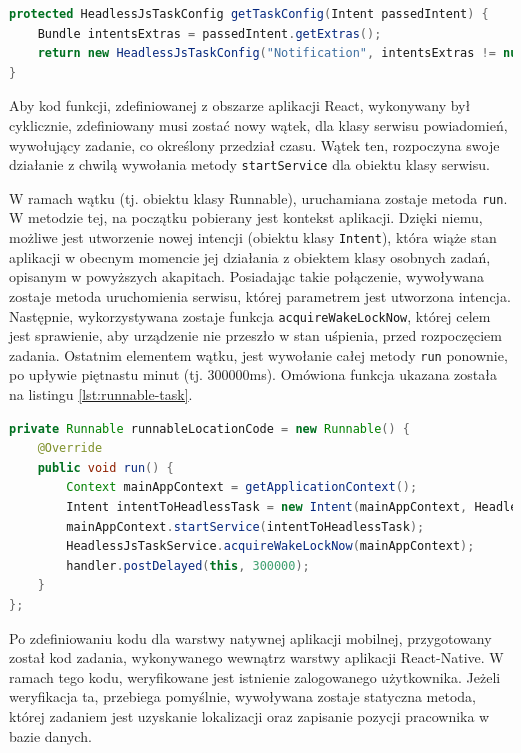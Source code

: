 \begin{lstlisting}[label=lst:headless-task-config,caption=Kod metody pozwalającej na zarejestrowanie osobnego zadania, captionpos=b, basicstyle=\footnotesize\ttfamily,style=sharpcstyle,language={Java}]
protected HeadlessJsTaskConfig getTaskConfig(Intent passedIntent) {
	Bundle intentsExtras = passedIntent.getExtras();
	return new HeadlessJsTaskConfig("Notification", intentsExtras != null ? Arguments.fromBundle(intentsExtras) : Arguments.createMap(),0,true);
}
\end{lstlisting}

Aby kod funkcji, zdefiniowanej z obszarze aplikacji React, wykonywany był cyklicznie, zdefiniowany musi zostać nowy wątek, dla klasy serwisu powiadomień, wywołujący zadanie, co określony przedział czasu. Wątek ten, rozpoczyna swoje działanie z chwilą wywołania metody \texttt{startService} dla obiektu klasy serwisu.

W ramach wątku (tj. obiektu klasy Runnable), uruchamiana zostaje metoda \texttt{run}. W metodzie tej, na początku pobierany jest kontekst aplikacji. Dzięki niemu, możliwe jest utworzenie nowej intencji (obiektu klasy \texttt{Intent}), która wiąże stan aplikacji w obecnym momencie jej działania z obiektem klasy osobnych zadań, opisanym w powyższych akapitach. Posiadając takie połączenie, wywoływana zostaje metoda uruchomienia serwisu, której parametrem jest utworzona intencja. Następnie, wykorzystywana zostaje funkcja \texttt{acquireWakeLockNow}, której celem jest sprawienie, aby urządzenie nie przeszło w stan uśpienia, przed rozpoczęciem zadania.
Ostatnim elementem wątku, jest wywołanie całej metody \texttt{run} ponownie, po upływie piętnastu minut (tj. 300000ms). Omówiona funkcja ukazana została na listingu \ref{lst:runnable-task}.

\begin{lstlisting}[label=lst:runnable-task,caption=Kod wątku wykonującego zadanie lokalizacji z interwałem czasowym, captionpos=b, basicstyle=\footnotesize\ttfamily,style=sharpcstyle,language={Java}]
private Runnable runnableLocationCode = new Runnable() {
	@Override
	public void run() {
		Context mainAppContext = getApplicationContext();
		Intent intentToHeadlessTask = new Intent(mainAppContext, HeadlessTaskConfig.class);
		mainAppContext.startService(intentToHeadlessTask);
		HeadlessJsTaskService.acquireWakeLockNow(mainAppContext);
		handler.postDelayed(this, 300000);
	}
};
\end{lstlisting}

Po zdefiniowaniu kodu dla warstwy natywnej aplikacji mobilnej, przygotowany został kod zadania, wykonywanego wewnątrz warstwy aplikacji React-Native. W ramach tego kodu, weryfikowane jest istnienie zalogowanego użytkownika. Jeżeli weryfikacja ta, przebiega pomyślnie, wywoływana zostaje statyczna metoda, której zadaniem jest uzyskanie lokalizacji oraz zapisanie pozycji pracownika w bazie danych.

